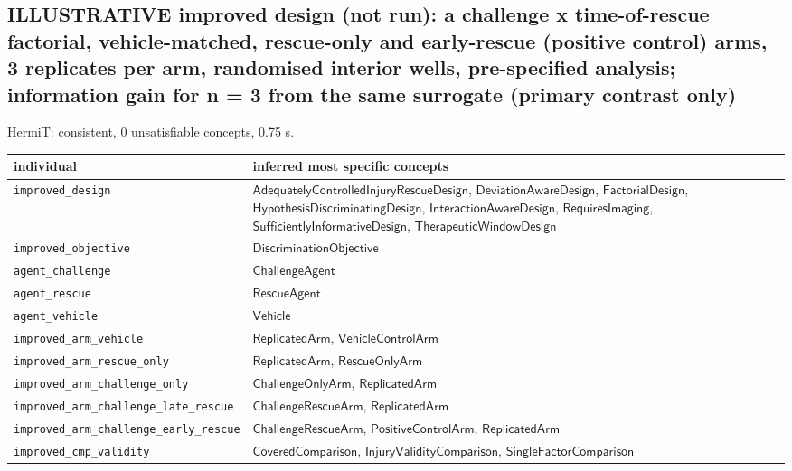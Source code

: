 \documentclass[10pt,a4paper]{article}
\begin{document}
\subsection*{ILLUSTRATIVE improved design (not run): a challenge x time-of-rescue factorial, vehicle-matched, rescue-only and early-rescue (positive control) arms, 3 replicates per arm, randomised interior wells, pre-specified analysis; information gain for n = 3 from the same surrogate (primary contrast only)}
HermiT: consistent, 0 unsatisfiable concepts, 0.75 s.
\par\noindent\begin{tabularx}{\linewidth}{@{}>{\raggedright\arraybackslash}p{4.2cm}>{\raggedright\arraybackslash}X@{}}\toprule individual & inferred most specific concepts \\ \midrule
\texttt{improved\_\allowbreak{}design} & $\mathsf{AdequatelyControlledInjuryRescueDesign}$, $\mathsf{DeviationAwareDesign}$, $\mathsf{FactorialDesign}$, $\mathsf{HypothesisDiscriminatingDesign}$, $\mathsf{InteractionAwareDesign}$, $\mathsf{RequiresImaging}$, $\mathsf{SufficientlyInformativeDesign}$, $\mathsf{TherapeuticWindowDesign}$ \\
\texttt{improved\_\allowbreak{}objective} & $\mathsf{DiscriminationObjective}$ \\
\texttt{agent\_\allowbreak{}challenge} & $\mathsf{ChallengeAgent}$ \\
\texttt{agent\_\allowbreak{}rescue} & $\mathsf{RescueAgent}$ \\
\texttt{agent\_\allowbreak{}vehicle} & $\mathsf{Vehicle}$ \\
\texttt{improved\_\allowbreak{}arm\_\allowbreak{}vehicle} & $\mathsf{ReplicatedArm}$, $\mathsf{VehicleControlArm}$ \\
\texttt{improved\_\allowbreak{}arm\_\allowbreak{}rescue\_\allowbreak{}only} & $\mathsf{ReplicatedArm}$, $\mathsf{RescueOnlyArm}$ \\
\texttt{improved\_\allowbreak{}arm\_\allowbreak{}challenge\_\allowbreak{}only} & $\mathsf{ChallengeOnlyArm}$, $\mathsf{ReplicatedArm}$ \\
\texttt{improved\_\allowbreak{}arm\_\allowbreak{}challenge\_\allowbreak{}late\_\allowbreak{}rescue} & $\mathsf{ChallengeRescueArm}$, $\mathsf{ReplicatedArm}$ \\
\texttt{improved\_\allowbreak{}arm\_\allowbreak{}challenge\_\allowbreak{}early\_\allowbreak{}rescue} & $\mathsf{ChallengeRescueArm}$, $\mathsf{PositiveControlArm}$, $\mathsf{ReplicatedArm}$ \\
\texttt{improved\_\allowbreak{}cmp\_\allowbreak{}validity} & $\mathsf{CoveredComparison}$, $\mathsf{InjuryValidityComparison}$, $\mathsf{SingleFactorComparison}$ \\

\end{tabularx}
\end{document}
